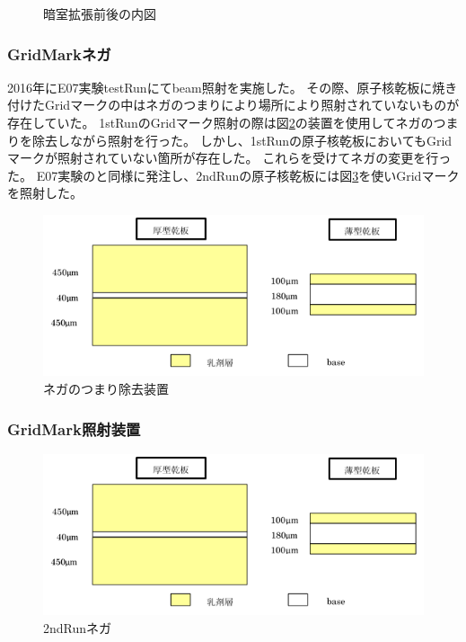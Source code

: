 \documentclass[12pt,a4paper]{jarticle}
\begin{document}
\begin{figure}[htbp]
\begin{center}
\begin{tabular}{c}
    \end{tabular}
    \caption{暗室拡張前後の内図\label{fig:darkroom}}
  \end{center}
\end{figure}
\subsubsection{GridMarkネガ}
2016年にE07実験testRunにてbeam照射を実施した。
その際、原子核乾板に焼き付けたGridマークの中はネガのつまりにより場所により照射されていないものが存在していた。
1stRunのGridマーク照射の際は図\ref{fig:nega_cleaner}の装置を使用してネガのつまりを除去しながら照射を行った。
しかし、1stRunの原子核乾板においてもGridマークが照射されていない箇所が存在した。
これらを受けてネガの変更を行った。
E07実験のと同様に発注し、2ndRunの原子核乾板には図\ref{fig:nega_2ndRun}を使いGridマークを照射した。
\begin{figure}[htbp]
  \begin{center}
   \includegraphics[width=140mm]{emulsionorder.png}
  \end{center}
  \caption{ネガのつまり除去装置\label{fig:nega_cleaner}}
\end{figure}
\subsubsection{GridMark照射装置}
\begin{figure}[htbp]
  \begin{center}
   \includegraphics[width=140mm]{emulsionorder.png}
  \end{center}
  \caption{2ndRunネガ\label{fig:nega_2ndRun}}
\end{figure}
\end{document}
